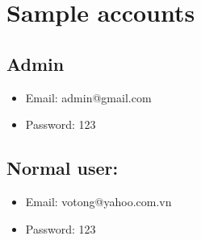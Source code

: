 \documentclass[11pt]{article}
\begin{document}
\section{Sample accounts}
\label{sec:org8d09f59}
\subsection{Admin}
\label{sec:orga73f596}
\begin{itemize}
\item Email: admin@gmail.com
\item Password: 123
\end{itemize}
\subsection{Normal user:}
\label{sec:org437fd31}
\begin{itemize}
\item Email: votong@yahoo.com.vn
\item Password: 123
\end{itemize}
\end{document}

